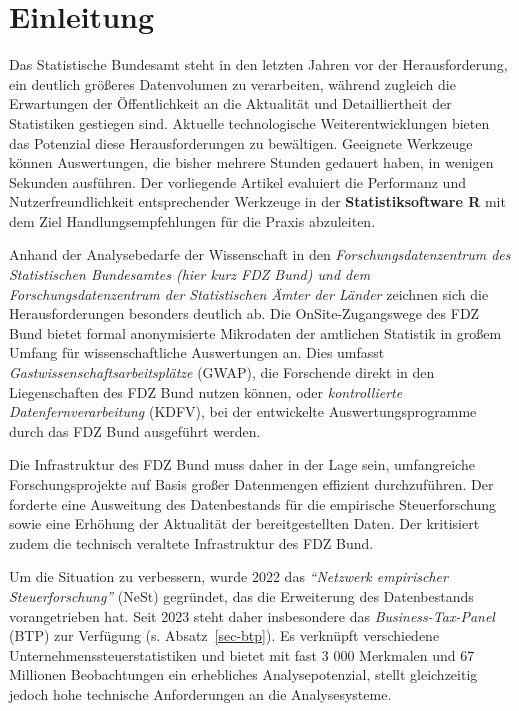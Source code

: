 \documentclass[
  german,
  10pt,
  twoside]{article}
\let\oldtextbf\textbf
\renewcommand{\textbf}[1]{{\color{wistaBlue}\oldtextbf{#1}}}
\let\oldref\ref
\renewcommand{\ref}[1]{\oldref{#1}\raisebox{-0.2ex}{\scriptsize\color{wistaBlue}\ding{247}}}
\begin{document}
\clearpage
\twocolumn

\section{Einleitung}\label{sec-einleitung}

Das Statistische Bundesamt steht in den letzten Jahren vor der
Herausforderung, ein deutlich größeres Datenvolumen zu verarbeiten,
während zugleich die Erwartungen der Öffentlichkeit an die Aktualität
und Detailliertheit der Statistiken gestiegen sind. Aktuelle
technologische Weiterentwicklungen bieten das Potenzial diese
Herausforderungen zu bewältigen. Geeignete Werkzeuge können
Auswertungen, die bisher mehrere Stunden gedauert haben, in wenigen
Sekunden ausführen. Der vorliegende Artikel evaluiert die Performanz und
Nutzerfreundlichkeit entsprechender Werkzeuge in der
\textbf{Statistiksoftware R} mit dem Ziel Handlungsempfehlungen für die
Praxis abzuleiten.

Anhand der Analysebedarfe der Wissenschaft in den
\emph{Forschungsdatenzentrum des Statistischen Bundesamtes (hier kurz
FDZ Bund) und dem Forschungsdatenzentrum der Statistischen Ämter der
Länder} zeichnen sich die Herausforderungen besonders deutlich ab. Die
OnSite-Zugangswege des FDZ Bund bietet formal anonymisierte Mikrodaten
der amtlichen Statistik in großem Umfang für wissenschaftliche
Auswertungen an. Dies umfasst \emph{Gastwissenschaftsarbeitsplätze}
(GWAP), die Forschende direkt in den Liegenschaften des FDZ Bund nutzen
können, oder \emph{kontrollierte Datenfernverarbeitung} (KDFV), bei der
entwickelte Auswertungsprogramme durch das FDZ Bund ausgeführt werden.

Die Infrastruktur des FDZ Bund muss daher in der Lage sein, umfangreiche
Forschungsprojekte auf Basis großer Datenmengen effizient durchzuführen.
Der \textcite{bmf2020dateninfrastruktur} forderte eine Ausweitung des
Datenbestands für die empirische Steuerforschung sowie eine Erhöhung der
Aktualität der bereitgestellten Daten. Der
\textcite{svr2023jahresgutachten} kritisiert zudem die technisch
veraltete Infrastruktur des FDZ Bund.

Um die Situation zu verbessern, wurde 2022 das \emph{``Netzwerk
empirischer Steuerforschung''} (NeSt) gegründet, das die Erweiterung des
Datenbestands vorangetrieben hat. Seit 2023 steht daher insbesondere das
\emph{Business-Tax-Panel} (BTP) zur Verfügung (s. Absatz~\ref{sec-btp}).
Es verknüpft verschiedene Unternehmenssteuerstatistiken und bietet mit
fast 3 000 Merkmalen und 67 Millionen Beobachtungen ein erhebliches
Analysepotenzial, stellt gleichzeitig jedoch hohe technische
Anforderungen an die Analysesysteme.
\end{document}
